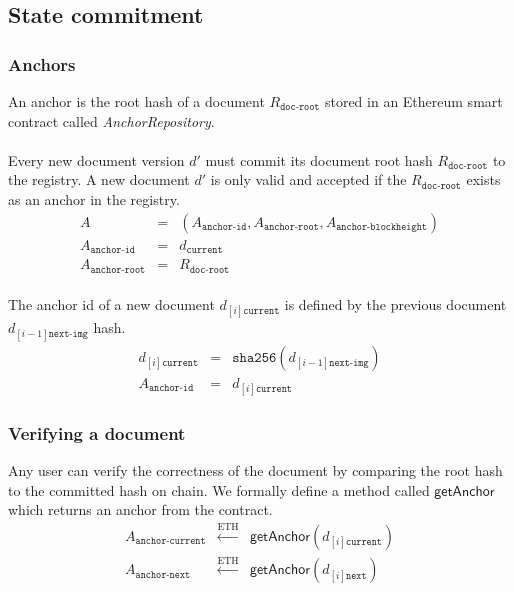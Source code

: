 \subsection{State commitment}

\subsubsection{Anchors}
An anchor is the root hash of a document $R_{\texttt{doc-root}}$ stored in an Ethereum smart contract called \textit{AnchorRepository}. 
\\\\
Every new document version $d'$ must commit its  document root hash $R_{\texttt{doc-root}}$ to the registry. A new document $d'$ is only valid and accepted if the $R_{\texttt{doc-root}}$ exists as an anchor in the registry.\\
\begin{eqnarray}
A &=& (A_{\texttt{anchor-id}}, A_{\texttt{anchor-root}}, A_{\texttt{anchor-blockheight}})\\
A_{\texttt{anchor-id}} & = & d_{\texttt{current}} \\
A_{\texttt{anchor-root}} & = & R_{\texttt{doc-root}}
\end{eqnarray}
\\
The anchor id of a new document $d_{[i]{\texttt{current}}}$ is defined by the previous document $d_{[i-1]\texttt{next-img}}$ hash.
\begin{eqnarray}
d_{[i]\texttt{current}}& = & \mathtt{sha256}(d_{[i-1]\texttt{next-img}})\\
A_{\texttt{anchor-id}}& = & d_{[i]\texttt{current}}
\end{eqnarray}

\subsubsection{Verifying a document}
Any user can verify the correctness of the document by comparing the root hash to the committed hash on chain. We formally define a method called $\mathsf{getAnchor}$ which returns an anchor from the contract.
\begin{eqnarray}
A_{\texttt{anchor-current}} & \xleftarrow[]{\text{ETH}}& \mathsf{getAnchor}(d_{[i]{\texttt{current}}}) \\
A_{\texttt{anchor-next}} & \xleftarrow[]{\text{ETH}} & \mathsf{getAnchor}(d_{[i]{\texttt{next}}}) \\
\end{eqnarray}

